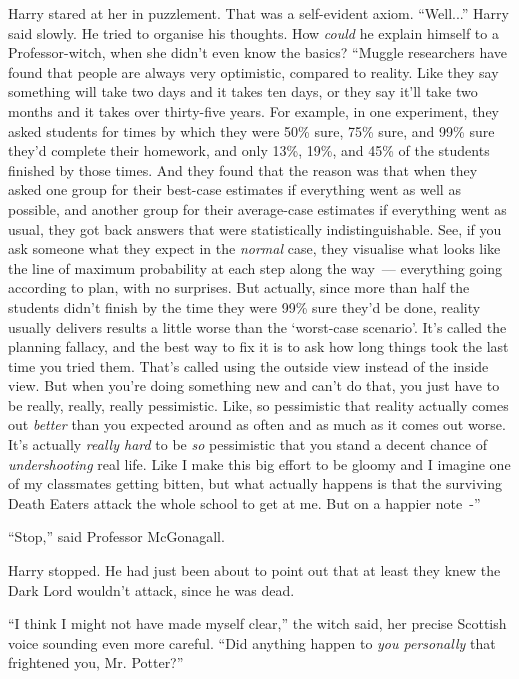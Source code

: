 Harry stared at her in puzzlement. That was a self-evident axiom. ``Well...'' Harry said slowly. He tried to organise his thoughts. How \emph{could} he explain himself to a Professor-witch, when she didn't even know the basics? ``Muggle researchers have found that people are always very optimistic, compared to reality. Like they say something will take two days and it takes ten days, or they say it'll take two months and it takes over thirty-five years. For example, in one experiment, they asked students for times by which they were 50\% sure, 75\% sure, and 99\% sure they'd complete their homework, and only 13\%, 19\%, and 45\% of the students finished by those times. And they found that the reason was that when they asked one group for their best-case estimates if everything went as well as possible, and another group for their average-case estimates if everything went as usual, they got back answers that were statistically indistinguishable. See, if you ask someone what they expect in the \emph{normal} case, they visualise what looks like the line of maximum probability at each step along the way~--- everything going according to plan, with no surprises. But actually, since more than half the students didn't finish by the time they were 99\% sure they'd be done, reality usually delivers results a little worse than the `worst-case scenario'. It's called the planning fallacy, and the best way to fix it is to ask how long things took the last time you tried them. That's called using the outside view instead of the inside view. But when you're doing something new and can't do that, you just have to be really, really, really pessimistic. Like, so pessimistic that reality actually comes out \emph{better} than you expected around as often and as much as it comes out worse. It's actually \emph{really hard} to be \emph{so} pessimistic that you stand a decent chance of \emph{undershooting} real life. Like I make this big effort to be gloomy and I imagine one of my classmates getting bitten, but what actually happens is that the surviving Death Eaters attack the whole school to get at me. But on a happier note~-''

``Stop,'' said Professor McGonagall.

Harry stopped. He had just been about to point out that at least they knew the Dark Lord wouldn't attack, since he was dead.

``I think I might not have made myself clear,'' the witch said, her precise Scottish voice sounding even more careful. ``Did anything happen to \emph{you personally} that frightened you, Mr. Potter?''

